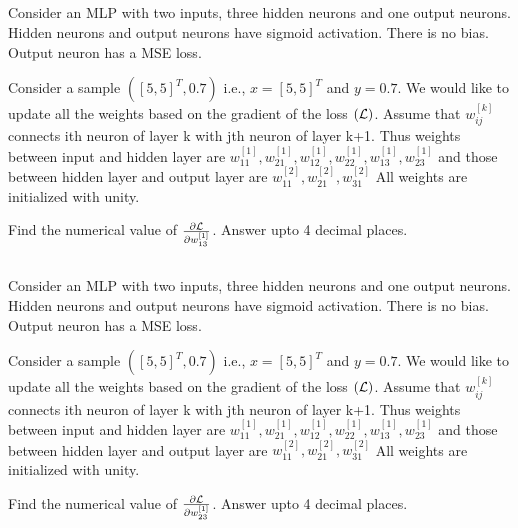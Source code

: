 \begin{frame}
\section{}
Consider an MLP with two inputs, three hidden neurons and one output neurons. Hidden neurons and output neurons have sigmoid activation. There is no bias. Output neuron has a MSE loss.

Consider a sample $([5,5]^T,0.7)$ i.e., $x = [5,5]^T$ and $y=0.7$. We would like to update all the weights based on the gradient of the loss $({\cal L})$. Assume that $w_{ij}^{[k]}$ connects ith neuron of layer k with jth neuron of layer k+1. Thus weights between input and hidden layer are $w_{11}^{[1]}, w_{21}^{[1]}, w_{12}^{[1]}, w_{22}^{[1]}, w_{13}^{[1]}, w_{23}^{[1]}$ and those between hidden layer and output layer are $w_{11}^{[2]}, w_{21}^{[2]}, w_{31}^{[2]}$
All weights are initialized with unity.

Find the numerical value of $\frac{\partial \cal L}{\partial w_{13}^{[1]}}$. Answer upto 4 decimal places.


\end{frame}

\begin{frame}
\section{}
Consider an MLP with two inputs, three hidden neurons and one output neurons. Hidden neurons and output neurons have sigmoid activation. There is no bias. Output neuron has a MSE loss.

Consider a sample $([5,5]^T,0.7)$ i.e., $x = [5,5]^T$ and $y=0.7$. We would like to update all the weights based on the gradient of the loss $({\cal L})$. Assume that $w_{ij}^{[k]}$ connects ith neuron of layer k with jth neuron of layer k+1. Thus weights between input and hidden layer are $w_{11}^{[1]}, w_{21}^{[1]}, w_{12}^{[1]}, w_{22}^{[1]}, w_{13}^{[1]}, w_{23}^{[1]}$ and those between hidden layer and output layer are $w_{11}^{[2]}, w_{21}^{[2]}, w_{31}^{[2]}$
All weights are initialized with unity.

Find the numerical value of $\frac{\partial \cal L}{\partial w_{23}^{[1]}}$. Answer upto 4 decimal places.



\end{frame}

